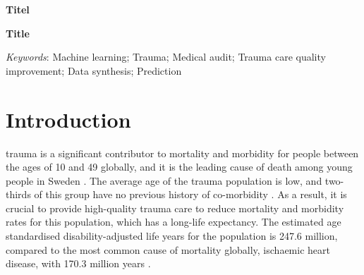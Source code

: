 \documentclass[12pt, a4paper]{article}
\begin{document}

\begin{titlepage}
    
\end{titlepage}
\fontsize{11}{13}\selectfont


\textbf{Titel}

\vfill

\textbf{Title}

\vfill

\textit{Keywords}: Machine learning; Trauma; Medical audit; Trauma care quality improvement; Data synthesis; Prediction

\newpage

\normalsize

\glsaddall
\printnoidxglossary[type=acronym,style=csuper]
\printnoidxglossary[style=gsuper]

\newpage
{}


\section{Introduction}
\Gls{trauma} is a significant contributor to mortality and morbidity for people between the ages of 10 and 49 globally, and it is the leading cause of death among young people in Sweden \cite{roth_global_2018, vos_global_2020, sos_death_2021}. The average age of the trauma population is low, and two-thirds of this group have no previous history of co-morbidity \cite{brattstrom_socio-economic_2015}. As a result, it is crucial to provide high-quality trauma care to reduce mortality and morbidity rates for this population, which has a long-life expectancy. The estimated age standardised disability-adjusted life years for the population is 247.6 million, compared to the most common cause of mortality globally, ischaemic heart disease, with 170.3 million years \cite{haagsma_global_2016,wang_global_2021,roth_global_2018}.
\end{document}

